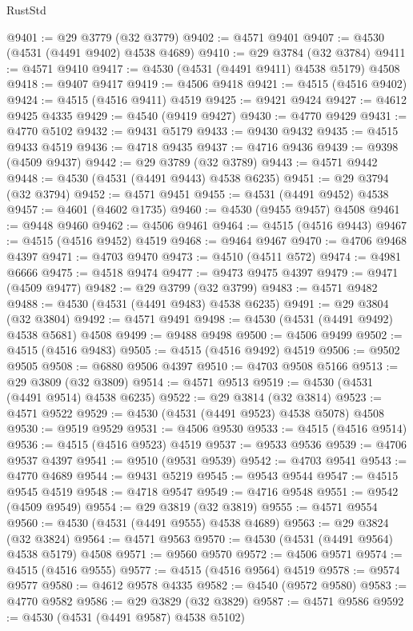 \begin{lexlean}{RustStd}
\begin{coremodule}
@9401 := @29 @3779 (@32 @3779)
@9402 := @4571 @9401
@9407 := @4530 (@4531 (@4491 @9402) @4538 @4689)
@9410 := @29 @3784 (@32 @3784)
@9411 := @4571 @9410
@9417 := @4530 (@4531 (@4491 @9411) @4538 @5179) @4508
@9418 := @9407 @9417
@9419 := @4506 @9418
@9421 := @4515 (@4516 @9402)
@9424 := @4515 (@4516 @9411) @4519
@9425 := @9421 @9424
@9427 := @4612 @9425 @4335
@9429 := @4540 (@9419 @9427)
@9430 := @4770 @9429
@9431 := @4770 @5102
@9432 := @9431 @5179
@9433 := @9430 @9432
@9435 := @4515 @9433 @4519
@9436 := @4718 @9435
@9437 := @4716 @9436
@9439 := @9398 (@4509 @9437)
@9442 := @29 @3789 (@32 @3789)
@9443 := @4571 @9442
@9448 := @4530 (@4531 (@4491 @9443) @4538 @6235)
@9451 := @29 @3794 (@32 @3794)
@9452 := @4571 @9451
@9455 := @4531 (@4491 @9452) @4538
@9457 := @4601 (@4602 @1735)
@9460 := @4530 (@9455 @9457) @4508
@9461 := @9448 @9460
@9462 := @4506 @9461
@9464 := @4515 (@4516 @9443)
@9467 := @4515 (@4516 @9452) @4519
@9468 := @9464 @9467
@9470 := @4706 @9468 @4397
@9471 := @4703 @9470
@9473 := @4510 (@4511 @572)
@9474 := @4981 @6666
@9475 := @4518 @9474
@9477 := @9473 @9475 @4397
@9479 := @9471 (@4509 @9477)
@9482 := @29 @3799 (@32 @3799)
@9483 := @4571 @9482
@9488 := @4530 (@4531 (@4491 @9483) @4538 @6235)
@9491 := @29 @3804 (@32 @3804)
@9492 := @4571 @9491
@9498 := @4530 (@4531 (@4491 @9492) @4538 @5681) @4508
@9499 := @9488 @9498
@9500 := @4506 @9499
@9502 := @4515 (@4516 @9483)
@9505 := @4515 (@4516 @9492) @4519
@9506 := @9502 @9505
@9508 := @6880 @9506 @4397
@9510 := @4703 @9508 @5166
@9513 := @29 @3809 (@32 @3809)
@9514 := @4571 @9513
@9519 := @4530 (@4531 (@4491 @9514) @4538 @6235)
@9522 := @29 @3814 (@32 @3814)
@9523 := @4571 @9522
@9529 := @4530 (@4531 (@4491 @9523) @4538 @5078) @4508
@9530 := @9519 @9529
@9531 := @4506 @9530
@9533 := @4515 (@4516 @9514)
@9536 := @4515 (@4516 @9523) @4519
@9537 := @9533 @9536
@9539 := @4706 @9537 @4397
@9541 := @9510 (@9531 @9539)
@9542 := @4703 @9541
@9543 := @4770 @4689
@9544 := @9431 @5219
@9545 := @9543 @9544
@9547 := @4515 @9545 @4519
@9548 := @4718 @9547
@9549 := @4716 @9548
@9551 := @9542 (@4509 @9549)
@9554 := @29 @3819 (@32 @3819)
@9555 := @4571 @9554
@9560 := @4530 (@4531 (@4491 @9555) @4538 @4689)
@9563 := @29 @3824 (@32 @3824)
@9564 := @4571 @9563
@9570 := @4530 (@4531 (@4491 @9564) @4538 @5179) @4508
@9571 := @9560 @9570
@9572 := @4506 @9571
@9574 := @4515 (@4516 @9555)
@9577 := @4515 (@4516 @9564) @4519
@9578 := @9574 @9577
@9580 := @4612 @9578 @4335
@9582 := @4540 (@9572 @9580)
@9583 := @4770 @9582
@9586 := @29 @3829 (@32 @3829)
@9587 := @4571 @9586
@9592 := @4530 (@4531 (@4491 @9587) @4538 @5102)

\end{coremodule}
\end{lexlean}
